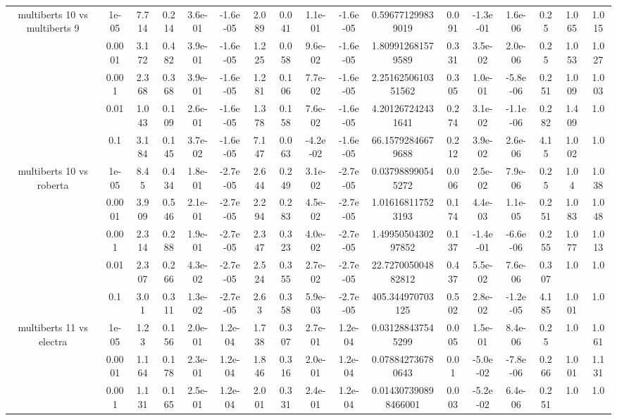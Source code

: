 \begin{tabular}{|c|c|c|c|c|c|c|c|c|c|c|c|c|c|c|c|c|}
\hline
\multirow{5}{*}{multiberts 10 vs multiberts 9} & 1e-05 & 7.714 & 0.214 & 3.6e-01 & -1.6e-05 & 2.089 & 0.041 & 1.1e-01 & -1.6e-05 & 0.596771299839019 & 0.091 & -1.3e-01 & 1.6e-06 & 0.25 & 1.065 & 1.015 \\
 & 0.0001 & 3.172 & 0.482 & 3.9e-01 & -1.6e-05 & 1.225 & 0.058 & 9.6e-02 & -1.6e-05 & 1.809912681579589 & 0.331 & 3.5e-02 & 2.0e-06 & 0.25 & 1.053 & 1.027 \\
 & 0.001 & 2.368 & 0.368 & 3.9e-01 & -1.6e-05 & 1.281 & 0.106 & 7.7e-02 & -1.6e-05 & 2.2516250610351562 & 0.305 & 1.0e-01 & -5.8e-06 & 0.251 & 1.009 & 1.003 \\
 & 0.01 & 1.043 & 0.109 & 2.6e-01 & -1.6e-05 & 1.378 & 0.158 & 7.6e-02 & -1.6e-05 & 4.201267242431641 & 0.274 & 3.1e-02 & -1.1e-06 & 0.282 & 1.409 & 1.0 \\
 & 0.1 & 3.184 & 0.145 & 3.7e-02 & -1.6e-05 & 7.147 & 0.063 & -4.2e-02 & -1.6e-05 & 66.15792846679688 & 0.212 & 3.9e-02 & 2.6e-06 & 4.15 & 1.002 & 1.0 \\
\hline
\multirow{5}{*}{multiberts 10 vs roberta } & 1e-05 & 8.45 & 0.434 & 1.8e-01 & -2.7e-05 & 2.644 & 0.249 & 3.1e-02 & -2.7e-05 & 0.037988990545272 & 0.006 & 2.5e-02 & 7.9e-06 & 0.25 & 1.04 & 1.038 \\
 & 0.0001 & 3.909 & 0.546 & 2.1e-01 & -2.7e-05 & 2.294 & 0.283 & 4.5e-02 & -2.7e-05 & 1.016168117523193 & 0.174 & 4.4e-03 & 1.1e-05 & 0.251 & 1.083 & 1.048 \\
 & 0.001 & 2.314 & 0.288 & 1.9e-01 & -2.7e-05 & 2.347 & 0.323 & 4.0e-02 & -2.7e-05 & 1.4995050430297852 & 0.137 & -1.4e-01 & -6.6e-06 & 0.255 & 1.077 & 1.013 \\
 & 0.01 & 2.307 & 0.266 & 4.3e-02 & -2.7e-05 & 2.524 & 0.355 & 2.7e-02 & -2.7e-05 & 22.727005004882812 & 0.437 & 5.5e-02 & 7.6e-06 & 0.307 & 1.0 & 1.0 \\
 & 0.1 & 3.01 & 0.311 & 1.3e-02 & -2.7e-05 & 2.63 & 0.358 & 5.9e-03 & -2.7e-05 & 405.344970703125 & 0.502 & 2.8e-02 & -1.2e-05 & 4.185 & 1.001 & 1.0 \\
\hline
\multirow{5}{*}{multiberts 11 vs electra } & 1e-05 & 1.23 & 0.156 & 2.0e-01 & 1.2e-04 & 1.738 & 0.307 & 2.7e-01 & 1.2e-04 & 0.031288437545299 & 0.005 & 1.5e-01 & 8.4e-06 & 0.25 & 1.0 & 1.061 \\
 & 0.0001 & 1.164 & 0.178 & 2.3e-01 & 1.2e-04 & 1.846 & 0.316 & 2.0e-01 & 1.2e-04 & 0.078842736780643 & 0.01 & -5.0e-02 & -7.8e-06 & 0.266 & 1.001 & 1.131 \\
 & 0.001 & 1.131 & 0.165 & 2.5e-01 & 1.2e-04 & 2.001 & 0.331 & 2.4e-01 & 1.2e-04 & 0.014307390898466001 & 0.003 & -5.2e-02 & 6.4e-06 & 0.251 & 1.0 & 1.0 \\

\end{tabular}
